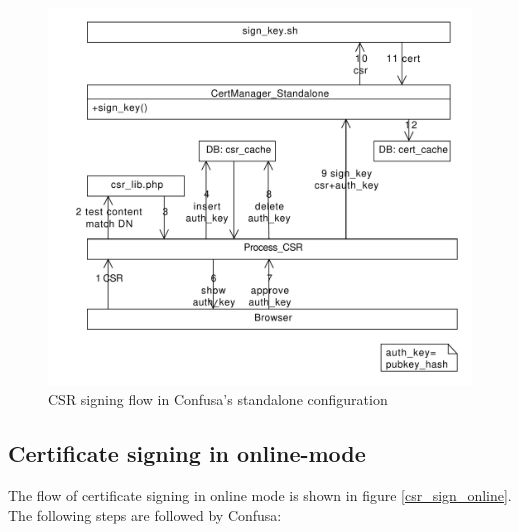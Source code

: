 \documentclass{scrartcl}
\begin{document}
\begin{figure}\label{csr_sign_standalone}
\begin{center}
\includegraphics[width=\textwidth]{cm_standalone_flow}
\caption{CSR signing flow in Confusa's standalone configuration}
\end{center}
\end{figure}

\subsection{Certificate signing in online-mode}

The flow of certificate signing in online mode is shown in figure \ref{csr_sign_online}. The following steps are followed by Confusa:
\end{document}
